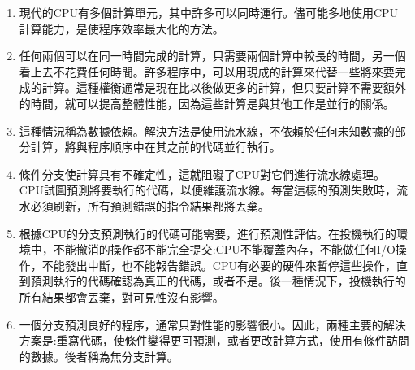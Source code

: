 \begin{enumerate}
\item 
現代的CPU有多個計算單元，其中許多可以同時運行。儘可能多地使用CPU計算能力，是使程序效率最大化的方法。

\item 
任何兩個可以在同一時間完成的計算，只需要兩個計算中較長的時間，另一個看上去不花費任何時間。許多程序中，可以用現成的計算來代替一些將來要完成的計算。這種權衡通常是現在比以後做更多的計算，但只要計算不需要額外的時間，就可以提高整體性能，因為這些計算是與其他工作是並行的關係。

\item 
這種情況稱為數據依賴。解決方法是使用流水線，不依賴於任何未知數據的部分計算，將與程序順序中在其之前的代碼並行執行。

\item
條件分支使計算具有不確定性，這就阻礙了CPU對它們進行流水線處理。CPU試圖預測將要執行的代碼，以便維護流水線。每當這樣的預測失敗時，流水必須刷新，所有預測錯誤的指令結果都將丟棄。

\item
根據CPU的分支預測執行的代碼可能需要，進行預測性評估。在投機執行的環境中，不能撤消的操作都不能完全提交:CPU不能覆蓋內存，不能做任何I/O操作，不能發出中斷，也不能報告錯誤。CPU有必要的硬件來暫停這些操作，直到預測執行的代碼確認為真正的代碼，或者不是。後一種情況下，投機執行的所有結果都會丟棄，對可見性沒有影響。

\item 
一個分支預測良好的程序，通常只對性能的影響很小。因此，兩種主要的解決方案是:重寫代碼，使條件變得更可預測，或者更改計算方式，使用有條件訪問的數據。後者稱為無分支計算。
	
\end{enumerate}